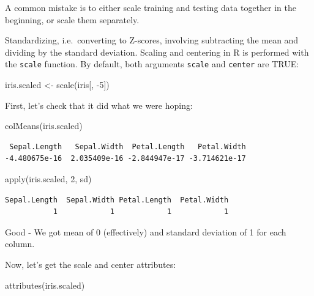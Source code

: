 \documentclass[
]{book}
\newenvironment{Shaded}{\begin{snugshade}}{\end{snugshade}}
\newcommand{\DecValTok}[1]{\textcolor[rgb]{0.00,0.00,0.81}{#1}}
\newcommand{\FunctionTok}[1]{\textcolor[rgb]{0.00,0.00,0.00}{#1}}
\newcommand{\NormalTok}[1]{#1}
\newcommand{\OtherTok}[1]{\textcolor[rgb]{0.56,0.35,0.01}{#1}}
\newcommand{\SpecialCharTok}[1]{\textcolor[rgb]{0.00,0.00,0.00}{#1}}
\begin{document}
A common mistake is to either scale training and testing data together in the beginning, or scale them separately.

Standardizing, i.e.~converting to Z-scores, involving subtracting the mean and dividing by the standard deviation.
Scaling and centering in R is performed with the \texttt{scale} function. By default, both arguments \texttt{scale} and \texttt{center} are TRUE:

\begin{Shaded}
\begin{Highlighting}[]
\NormalTok{iris.scaled }\OtherTok{\textless{}{-}} \FunctionTok{scale}\NormalTok{(iris[, }\SpecialCharTok{{-}}\DecValTok{5}\NormalTok{])}
\end{Highlighting}
\end{Shaded}

First, let's check that it did what we were hoping:

\begin{Shaded}
\begin{Highlighting}[]
\FunctionTok{colMeans}\NormalTok{(iris.scaled)}
\end{Highlighting}
\end{Shaded}

\begin{verbatim}
 Sepal.Length   Sepal.Width  Petal.Length   Petal.Width 
-4.480675e-16  2.035409e-16 -2.844947e-17 -3.714621e-17 
\end{verbatim}

\begin{Shaded}
\begin{Highlighting}[]
\FunctionTok{apply}\NormalTok{(iris.scaled, }\DecValTok{2}\NormalTok{, sd)}
\end{Highlighting}
\end{Shaded}

\begin{verbatim}
Sepal.Length  Sepal.Width Petal.Length  Petal.Width 
           1            1            1            1 
\end{verbatim}

Good - We got mean of 0 (effectively) and standard deviation of 1 for each column.

Now, let's get the scale and center attributes:

\begin{Shaded}
\begin{Highlighting}[]
\FunctionTok{attributes}\NormalTok{(iris.scaled)}
\end{Highlighting}
\end{Shaded}
\end{document}
